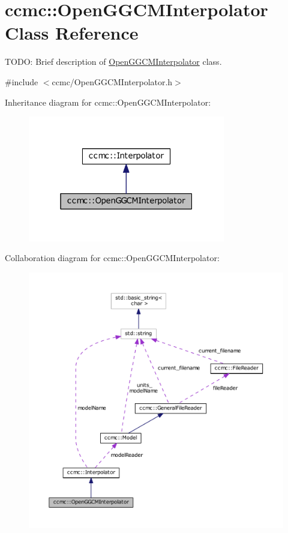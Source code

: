 \hypertarget{classccmc_1_1_open_g_g_c_m_interpolator}{\section{ccmc\-:\-:Open\-G\-G\-C\-M\-Interpolator Class Reference}
\label{classccmc_1_1_open_g_g_c_m_interpolator}
}


T\-O\-D\-O\-: Brief description of \hyperlink{classccmc_1_1_open_g_g_c_m_interpolator}{Open\-G\-G\-C\-M\-Interpolator} class.  




{\ttfamily \#include $<$ccmc/\-Open\-G\-G\-C\-M\-Interpolator.\-h$>$}



Inheritance diagram for ccmc\-:\-:Open\-G\-G\-C\-M\-Interpolator\-:\nopagebreak
\begin{figure}[H]
\begin{center}
\leavevmode
\includegraphics[width=244pt]{classccmc_1_1_open_g_g_c_m_interpolator__inherit__graph}
\end{center}
\end{figure}


Collaboration diagram for ccmc\-:\-:Open\-G\-G\-C\-M\-Interpolator\-:\nopagebreak
\begin{figure}[H]
\begin{center}
\leavevmode
\includegraphics[width=350pt]{classccmc_1_1_open_g_g_c_m_interpolator__coll__graph}
\end{center}
\end{figure}
